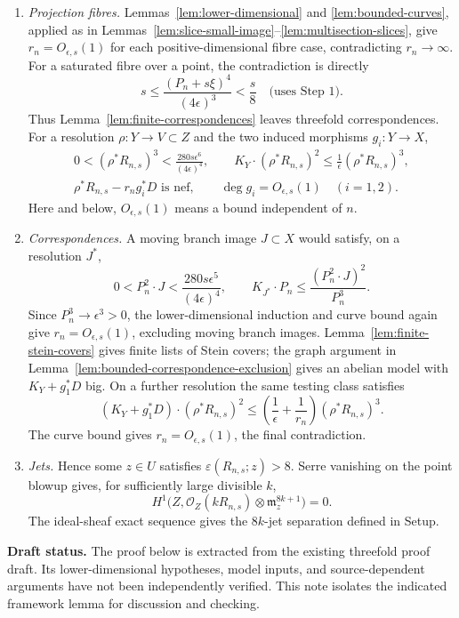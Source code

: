 \documentclass[12pt,a4paper,psamsfonts]{amsart}
\theoremstyle{definition}
\theoremstyle{plain}
\newcommand{\OO}{\mathcal O}
\begin{document}
\begin{enumerate}
\item \emph{Projection fibres.} Lemmas~\ref{lem:lower-dimensional}
and \ref{lem:bounded-curves}, applied as in
Lemmas~\ref{lem:slice-small-image}--\ref{lem:multisection-slices},
give $r_n=O_{\epsilon,s}(1)$ for each positive-dimensional fibre
case, contradicting $r_n\to\infty$. For a saturated fibre over a point,
the contradiction is directly
\[
 s\le\frac{(P_n+s\xi)^4}{(4\epsilon)^3}<\frac{s}{8}
                                      \quad\text{(uses Step 1)}.
\]
Thus Lemma~\ref{lem:finite-correspondences} leaves threefold
correspondences. For a resolution $\rho:Y\to V\subset Z$ and the
two induced morphisms $g_i:Y\to X$,
\[
 \begin{gathered}
 0<(\rho^*R_{n,s})^3
       <\frac{280s\epsilon^6}{(4\epsilon)^4},\qquad
 K_Y\cdot(\rho^*R_{n,s})^2\le\frac1\epsilon(\rho^*R_{n,s})^3,\\
 \rho^*R_{n,s}-r_ng_i^*D\text{ is nef},\qquad
 \deg g_i=O_{\epsilon,s}(1)\quad(i=1,2).
 \end{gathered}
\]
Here and below, $O_{\epsilon,s}(1)$ means a bound independent of $n$.

\item \emph{Correspondences.} A moving branch image $J\subset X$
would satisfy, on a resolution $J^*$,
\[
 0<P_n^2\cdot J
       <\frac{280s\epsilon^5}{(4\epsilon)^4},\qquad
 K_{J^*}\cdot P_n\le\frac{(P_n^2\cdot J)^2}{P_n^3}.
\]
Since $P_n^3\to\epsilon^3>0$, the lower-dimensional induction and
curve bound again give $r_n=O_{\epsilon,s}(1)$, excluding moving
branch images. Lemma~\ref{lem:finite-stein-covers} gives finite
lists of Stein covers; the graph argument in
Lemma~\ref{lem:bounded-correspondence-exclusion} gives an abelian
model with $K_Y+g_1^*D$ big. On a further resolution the same
testing class satisfies
\[
 (K_Y+g_1^*D)\cdot(\rho^*R_{n,s})^2
    \le\left(\frac1\epsilon+\frac1{r_n}\right)(\rho^*R_{n,s})^3.
\]
The curve bound gives $r_n=O_{\epsilon,s}(1)$, the final contradiction.

\item \emph{Jets.} Hence some $z\in U$ satisfies
$\varepsilon(R_{n,s};z)>8$. Serre vanishing on the point blowup
gives, for sufficiently large divisible $k$,
\[
 H^1\bigl(Z,\OO_Z(kR_{n,s})\otimes\mathfrak m_z^{8k+1}\bigr)=0.
\]
The ideal-sheaf exact sequence gives the $8k$-jet separation
defined in Setup.
\end{enumerate}

\medskip
\noindent\textbf{Draft status.}
The proof below is extracted from the existing threefold proof draft.
Its lower-dimensional hypotheses, model inputs, and source-dependent
arguments have not been independently verified. This note isolates the indicated framework lemma for discussion
and checking.
\end{document}
